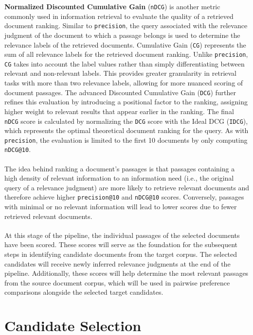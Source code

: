 \textbf{Normalized Discounted Cumulative Gain} (\texttt{nDCG}) is another metric commonly used in information retrieval to evaluate the quality of a retrieved document ranking. Similar to \texttt{precision}, the query associated with the relevance judgment of the document to which a passage belongs is used to determine the relevance labels of the retrieved documents. Cumulative Gain (\texttt{CG}) represents the sum of all relevance labels for the retrieved document ranking. Unlike \texttt{precision}, \texttt{CG} takes into account the label values rather than simply differentiating between relevant and non-relevant labels. This provides greater granularity in retrieval tasks with more than two relevance labels, allowing for more nuanced scoring of document passages. The advanced Discounted Cumulative Gain (\texttt{DCG}) further refines this evaluation by introducing a positional factor to the ranking, assigning higher weight to relevant results that appear earlier in the ranking. The final \texttt{nDCG} score is calculated by normalizing the \texttt{DCG} score with the Ideal DCG (\texttt{IDCG}), which represents the optimal theoretical document ranking for the query. As with \texttt{precision}, the evaluation is limited to the first 10 documents by only computing \texttt{nDCG@10}.
\\\\
The idea behind ranking a document's passages is that passages containing a high density of relevant information to an information need (i.e., the original query of a relevance judgment) are more likely to retrieve relevant documents and therefore achieve higher \texttt{precision@10} and \texttt{nDCG@10} scores. Conversely, passages with minimal or no relevant information will lead to lower scores due to fewer retrieved relevant documents.
\\\\
At this stage of the pipeline, the individual passages of the selected documents have been scored. These scores will serve as the foundation for the subsequent steps in identifying candidate documents from the target corpus. The selected candidates will receive newly inferred relevance judgments at the end of the pipeline. Additionally, these scores will help determine the most relevant passages from the source document corpus, which will be used in pairwise preference comparisons alongside the selected target candidates.


\section{Candidate Selection}\label{candidate-selection}

